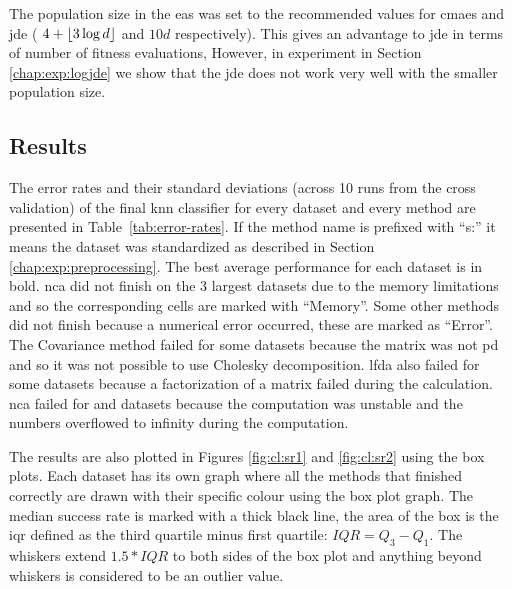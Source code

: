 \documentclass[12pt,a4paper]{report}
\begin{document}
The population size in the \acp{ea} was set to the recommended values for \ac{cmaes} and \ac{jde} ( $4+\lfloor3\log{d}\rfloor$ and $10d$ respectively). This gives an advantage to \ac{jde} in terms of number of fitness evaluations, However, in experiment in Section \ref{chap:exp:logjde} we show that the \ac{jde} does not work very well with the smaller population size.

\subsection{Results}

The error rates and their standard deviations (across 10 runs from the cross validation) of the final \ac{knn} classifier for every dataset and every method are presented in Table~\ref{tab:error-rates}. If the method name is prefixed with ``s:'' it means the dataset was standardized as described in Section \ref{chap:exp:preprocessing}. The best average performance for each dataset is in bold. \ac{nca} did not finish on the 3 largest datasets due to the memory limitations and so the corresponding cells are marked with ``Memory''. Some other methods did not finish because a numerical error occurred, these are marked as ``Error''. The Covariance method failed for some datasets because the matrix was not \ac{pd} and so it was not possible to use Cholesky decomposition. \ac{lfda} also failed for some datasets because a factorization of a matrix failed during the calculation. \ac{nca} failed for  and  datasets because the computation was unstable and the numbers overflowed to infinity during the computation.



The results are also plotted in Figures \ref{fig:cl:sr1} and \ref{fig:cl:sr2} using the box plots. Each dataset has its own graph where all the methods that finished correctly are drawn with their specific colour using the box plot graph. The median success rate is marked with a thick black line, the area of the box is the \ac{iqr} defined as the third quartile minus first quartile: $IQR = Q_3 - Q_1$. The whiskers extend $1.5*IQR$ to both sides of the box plot and anything beyond whiskers is considered to be an outlier value.

\end{document}
